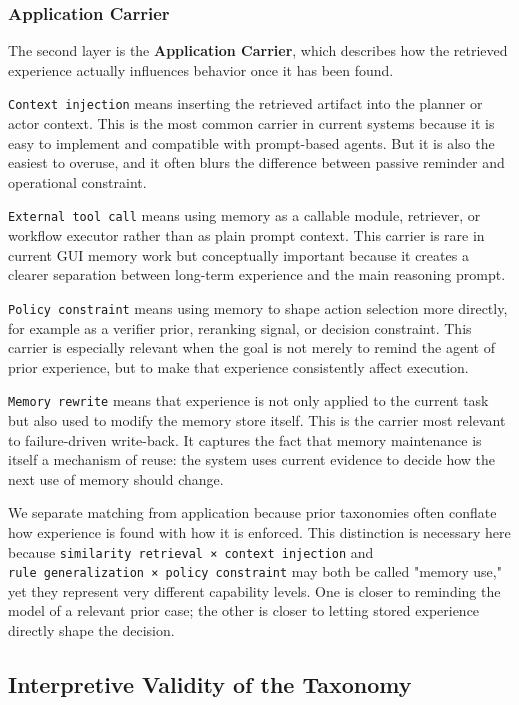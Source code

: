 \documentclass{article}
\begin{document}
\subsubsection{Application Carrier}\label{432-application-carrier}

The second layer is the \textbf{Application Carrier}, which describes
how the retrieved experience actually influences behavior once it has
been found.

\texttt{Context\ injection} means inserting the retrieved artifact into
the planner or actor context. This is the most common carrier in current
systems because it is easy to implement and compatible with prompt-based
agents. But it is also the easiest to overuse, and it often blurs the
difference between passive reminder and operational constraint.

\texttt{External\ tool\ call} means using memory as a callable module,
retriever, or workflow executor rather than as plain prompt context.
This carrier is rare in current GUI memory work but conceptually
important because it creates a clearer separation between long-term
experience and the main reasoning prompt.

\texttt{Policy\ constraint} means using memory to shape action selection
more directly, for example as a verifier prior, reranking signal, or
decision constraint. This carrier is especially relevant when the goal
is not merely to remind the agent of prior experience, but to make that
experience consistently affect execution.

\texttt{Memory\ rewrite} means that experience is not only applied to
the current task but also used to modify the memory store itself. This
is the carrier most relevant to failure-driven write-back. It captures
the fact that memory maintenance is itself a mechanism of reuse: the
system uses current evidence to decide how the next use of memory should
change.

We separate matching from application because prior taxonomies often
conflate how experience is found with how it is enforced. This
distinction is necessary here because
\texttt{similarity\ retrieval\ ×\ context\ injection} and
\texttt{rule\ generalization\ ×\ policy\ constraint} may both be called
"memory use," yet they represent very different capability levels. One
is closer to reminding the model of a relevant prior case; the other is
closer to letting stored experience directly shape the decision.

\subsection{Interpretive Validity of the
Taxonomy}\label{44-interpretive-validity-of-the-taxonomy}
\end{document}

